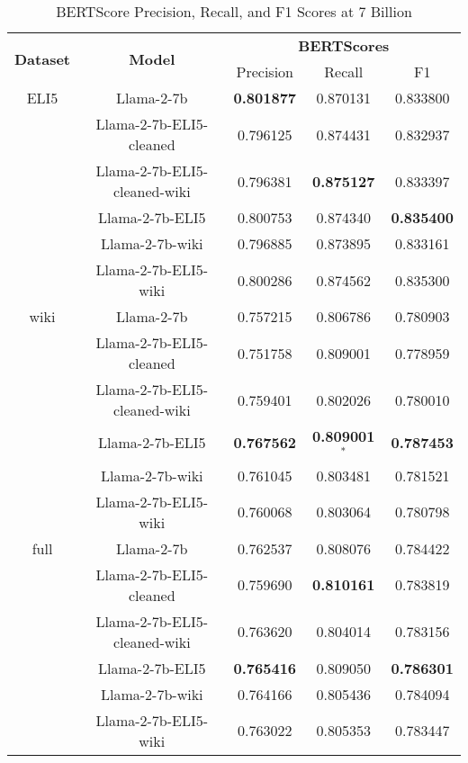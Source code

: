\documentclass[11pt, oneside]{article}   	%
\begin{document}
\begin{table}
\centering
\begin{tabular}{ccccc}
\hline
\multirow{2}{*}{\textbf{Dataset}} & \multirow{2}{*}{\textbf{Model}} & \multicolumn{3}{c}{\textbf{BERTScores}} \\
& & Precision & Recall & F1 \\
\hline
ELI5 & Llama-2-7b & \textbf{0.801877} & 0.870131 & 0.833800 \\
 & Llama-2-7b-ELI5-cleaned & 0.796125 & 0.874431 & 0.832937 \\
 & Llama-2-7b-ELI5-cleaned-wiki & 0.796381 & \textbf{0.875127} & 0.833397 \\
 & Llama-2-7b-ELI5 & 0.800753 & 0.874340 & \textbf{0.835400} \\
 & Llama-2-7b-wiki & 0.796885 & 0.873895 & 0.833161 \\
 & Llama-2-7b-ELI5-wiki & 0.800286 & 0.874562 & 0.835300 \\
\hline
wiki & Llama-2-7b & 0.757215 & 0.806786 & 0.780903 \\
 & Llama-2-7b-ELI5-cleaned & 0.751758 & 0.809001 & 0.778959 \\
 & Llama-2-7b-ELI5-cleaned-wiki & 0.759401 & 0.802026 & 0.780010 \\
 & Llama-2-7b-ELI5 & \textbf{0.767562} & \textbf{0.809001}$^{*}$ & \textbf{0.787453} \\
 & Llama-2-7b-wiki & 0.761045 & 0.803481 & 0.781521 \\
 & Llama-2-7b-ELI5-wiki & 0.760068 & 0.803064 & 0.780798 \\
 \hline
full & Llama-2-7b & 0.762537 & 0.808076 & 0.784422 \\
 & Llama-2-7b-ELI5-cleaned & 0.759690 & \textbf{0.810161} & 0.783819 \\
 & Llama-2-7b-ELI5-cleaned-wiki & 0.763620 & 0.804014 & 0.783156 \\
 & Llama-2-7b-ELI5 & \textbf{0.765416} & 0.809050 & \textbf{0.786301} \\
 & Llama-2-7b-wiki & 0.764166 & 0.805436 & 0.784094 \\
 & Llama-2-7b-ELI5-wiki & 0.763022 & 0.805353 & 0.783447 \\
\hline
\end{tabular}
\caption{BERTScore Precision, Recall, and F1 Scores at 7 Billion}
\label{tab:scores}
\end{table}


\end{document}
